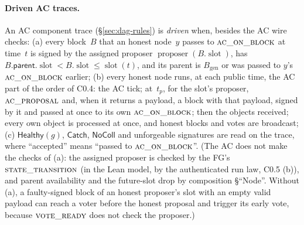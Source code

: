 \documentclass{article}
\newcommand{\genesis}{B_{\mathrm{gen}}}
\newcommand{\slot}{\operatorname{slot}}
\newcommand{\fname}[1]{\text{\textsc{#1}}}
\begin{document}
\paragraph{Driven AC traces.}  An AC component trace
(\S\ref{sec:dag-rules}) is \emph{driven} when, besides the AC wire checks:
(a) every block~$B$ that an honest node~$y$ passes to
$\fname{ac\_on\_block}$ at time~$t$ is signed by the assigned proposer
$\operatorname{proposer}(B.\slot)$, has $B.\mathsf{parent}.\slot<B.\slot\leq
\slot(t)$, and its parent is $\genesis$ or was passed to $y$'s
$\fname{ac\_on\_block}$ earlier;
(b) every honest node runs, at each public time, the AC part of the order of
C0.4: the AC tick; at~$t_p$, for the slot's proposer,
$\fname{ac\_proposal}$ and, when it returns a payload, a block with that
payload, signed by it and passed at once to its own $\fname{ac\_on\_block}$;
then the objects received; every own object is processed at once, and honest
blocks and votes are broadcast;
(c) $\mathsf{Healthy}(g)$, $\mathsf{Catch}$, $\mathsf{NoColl}$ and
unforgeable signatures are read on the trace, where ``accepted'' means
``passed to $\fname{ac\_on\_block}$''.
(The AC does not make the checks of (a): the assigned proposer is checked by
the FG's $\fname{state\_transition}$ (in the Lean model, by the authenticated
run law, C0.5 (b)), and parent availability and the
future-slot drop by composition \S``Node''.  Without (a), a faulty-signed
block of an honest proposer's slot with an empty valid payload can reach a
voter before the honest proposal and trigger its early vote, because
$\fname{vote\_ready}$ does not check the proposer.)
\end{document}
